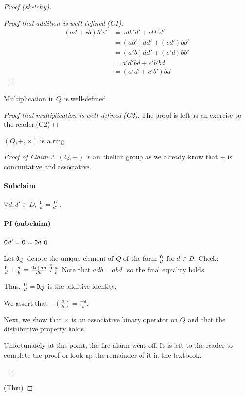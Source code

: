 \documentclass[notes.tex]{subfiles}
\begin{document}
\begin{proof}[Proof (sketchy)]
\begin{proof}[Proof that addition is well defined (C1)]
	\begin{align*}
		(ad+cb)b'd' &= adb'd' + cbb'd'\\
		&= (ab')dd' + (cd')bb'\\
		&= (a'b)dd' + (c'd)bb'\\
		&= a'd'bd + c'b'bd\\
		&=(a'd'+c'b')bd
	\end{align*}
\end{proof}
\begin{claim}[2]
	Multiplication in $Q$ is well-defined
\end{claim}
\begin{proof}[Proof that multiplication is well defined (C2)]
	The proof is left as an exercise to the reader.\qedhere(C2)
\end{proof}

\begin{claim}[3]
	$(Q, +, \times)$ is a ring
\end{claim}
\begin{proof}[Proof of Claim 3]
	$(Q, +)$ is an abelian group as we already know that $+$ is commutative and associative.

	\paragraph{Subclaim} $\forall d, d'\in D$, $\frac{\mathsf{0}}{d} = \frac{\mathsf{0}}{d'}$.
	\paragraph{Pf (subclaim)} $\mathsf{0} d' = \mathsf{0} = \mathsf{0} d$\qed

	Let $\mathsf{0}_Q$ denote the unique element of $Q$ of the form $\frac{\mathsf{0}}{d}$ for $d\in D$.
	Check: $\frac{\zero}{d} + \frac{a}{b} = \frac{0b+ad}{db} \overop?=\frac{a}{b}$ Note that $adb = abd,$ so the final equality holds.

	Thus, $\frac{\mathsf{0}}{d} = \mathsf{0}_Q$ is the additive identity.

	We assert that $-\left(\frac{a}{b}\right) = \frac{-a}{b}$.

	Next, we show that $\times$ is an associative binary operator on $Q$ and that the distributive property holds.

	\begin{fire}
		Unfortunately at this point, the fire alarm went off. It is left to the reader to complete the proof or look up the remainder of it in the textbook.
	\end{fire}
\end{proof}

\qedhere(Thm)
\end{proof}
\end{document}
